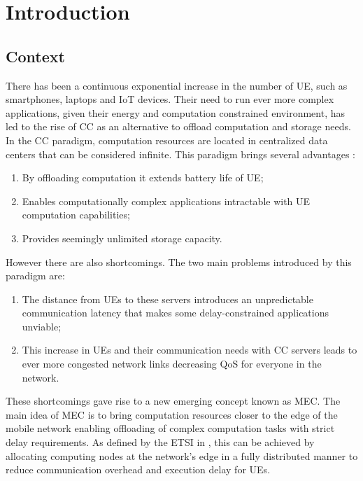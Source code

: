 \chapter{Introduction}
\label{chapter:introduction}
\setcounter{page}{1}
\section{Context}
\noindent There has been a continuous exponential increase in the number of \acrfull{UE}, such as smartphones, laptops and \acrfull{IoT} devices. Their need to run ever more complex applications, given their energy and computation constrained environment, has led to the rise of \acrfull{CC} as an alternative to offload computation and storage needs. In the \acrshort{CC} paradigm, computation resources are located in centralized data centers that can be considered infinite. This paradigm brings several advantages \cite{SHAKARAMI2020107496}: 
\begin{enumerate}
    \item By offloading computation it extends battery life of \acrshort{UE}; 
    \item Enables computationally complex applications intractable with \acrshort{UE} computation capabilities;
    \item Provides seemingly unlimited storage capacity.
\end{enumerate}
However there are also shortcomings. The two main problems introduced by this paradigm are: 
\begin{enumerate}
    \item The distance from \acrshort{UE}s to these servers introduces an unpredictable communication latency that makes some delay-constrained applications unviable;
    \item  This increase in \acrshort{UE}s and their communication needs with \acrshort{CC} servers leads to ever more congested network links decreasing \acrfull{QoS} for everyone in the network.
\end{enumerate}

\par
These shortcomings gave rise to a new emerging concept known as \acrfull{MEC}. The main idea of \acrshort{MEC} is to bring computation resources closer to the edge of the mobile network enabling offloading of complex computation tasks with strict delay requirements. As defined by the \acrfull{ETSI} in \cite{MECspec}, this can be achieved by allocating computing nodes at the network's edge in a fully distributed manner to reduce communication overhead and execution delay for \acrshort{UE}s.

